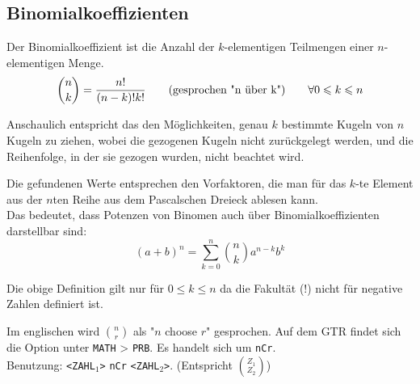 \documentclass[main.tex]{subfiles}
\begin{document}
\subsection{Binomialkoeffizienten}
\begin{Definition}
  Der Binomialkoeffizient ist die Anzahl der $k$-elementigen Teilmengen einer $n$-elementigen Menge.
  $$ {n\choose k} = \dfrac{n!}{(n-k)!k!} \text{\qquad (gesprochen "n über k")}\qquad \forall 0 \leq k \leq n$$
\end{Definition}
\begin{Bemerkung}
  Anschaulich entspricht das den Möglichkeiten, genau $k$ bestimmte Kugeln von $n$ Kugeln zu ziehen, wobei die gezogenen Kugeln nicht zurückgelegt werden, und die Reihenfolge, in der sie gezogen wurden, nicht beachtet wird.
\end{Bemerkung}
\begin{Bemerkung}
  Die gefundenen Werte entsprechen den Vorfaktoren, die man für das $k$-te Element aus der $n$ten Reihe aus dem Pascalschen Dreieck ablesen kann.\\
  Das bedeutet, dass Potenzen von Binomen auch über Binomialkoeffizienten darstellbar sind:
  $$(a+b)^n = \sum_{k=0}^n {n\choose k} a^{n-k}b^{k}$$
\end{Bemerkung}

\begin{Bemerkung}
  Die obige Definition gilt nur für $0 \leq k \leq n$ da die Fakultät ($!$) nicht für negative Zahlen definiert ist.
\end{Bemerkung}

\begin{GTR-Tipp}
  Im englischen wird ${n \choose r}$ als "$n$ choose $r$" gesprochen. Auf dem GTR findet sich die Option unter \texttt{MATH} > \texttt{PRB}. Es handelt sich um \texttt{nCr}.\\
  Benutzung: \texttt{<ZAHL$_1$>} \texttt{nCr} \texttt{<ZAHL$_2$>}. (Entspricht ${Z_1 \choose Z_2}$)
\end{GTR-Tipp}
\end{document}
